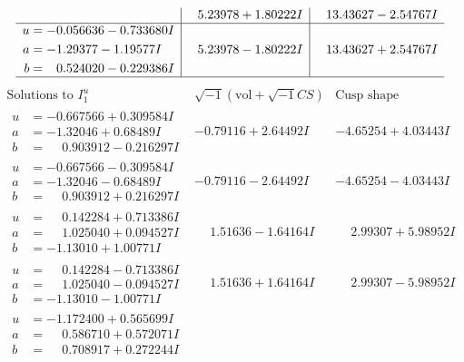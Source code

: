 \documentclass[1p]{elsarticle_modified}
\theoremstyle{definition}
\newcommand{\I}{\sqrt{-1}}
\begin{document}
$$\begin{array}{c|c|c}
 & \phantom{-}5.23978 + 1.80222 I & \phantom{-}13.43627 - 2.54767 I \\ \hline\begin{aligned}
u &= -0.056636 - 0.733680 I \\
a &= -1.29377 - 1.19577 I \\
b &= \phantom{-}0.524020 - 0.229386 I\end{aligned}
 & \phantom{-}5.23978 - 1.80222 I & \phantom{-}13.43627 + 2.54767 I\\
 \hline 
 \end{array}$$\newpage$$\begin{array}{c|c|c}  
\text{Solutions to }I^u_{1}& \I (\text{vol} + \sqrt{-1}CS) & \text{Cusp shape}\\
 \hline 
\begin{aligned}
u &= -0.667566 + 0.309584 I \\
a &= -1.32046 + 0.68489 I \\
b &= \phantom{-}0.903912 - 0.216297 I\end{aligned}
 & -0.79116 + 2.64492 I & -4.65254 + 4.03443 I \\ \hline\begin{aligned}
u &= -0.667566 - 0.309584 I \\
a &= -1.32046 - 0.68489 I \\
b &= \phantom{-}0.903912 + 0.216297 I\end{aligned}
 & -0.79116 - 2.64492 I & -4.65254 - 4.03443 I \\ \hline\begin{aligned}
u &= \phantom{-}0.142284 + 0.713386 I \\
a &= \phantom{-}1.025040 + 0.094527 I \\
b &= -1.13010 + 1.00771 I\end{aligned}
 & \phantom{-}1.51636 - 1.64164 I & \phantom{-}2.99307 + 5.98952 I \\ \hline\begin{aligned}
u &= \phantom{-}0.142284 - 0.713386 I \\
a &= \phantom{-}1.025040 - 0.094527 I \\
b &= -1.13010 - 1.00771 I\end{aligned}
 & \phantom{-}1.51636 + 1.64164 I & \phantom{-}2.99307 - 5.98952 I \\ \hline\begin{aligned}
u &= -1.172400 + 0.565699 I \\
a &= \phantom{-}0.586710 + 0.572071 I \\
b &= \phantom{-}0.708917 + 0.272244 I\end{aligned}

\end{array}$$
\end{document}

